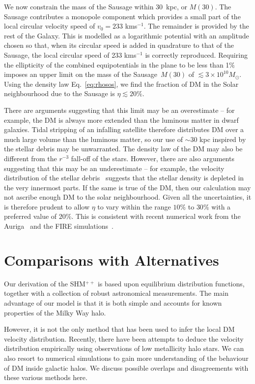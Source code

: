 \documentclass[prd,10pt,twocolumn,showpacs,nofootinbib, aps,superscriptaddress,preprintnumbers]{revtex4-1}
\begin{document}
We now constrain the mass of the Sausage within 30~kpc, or
$M(30)$. The Sausage contributes a monopole component which provides a
small part of the local circular velocity speed of $v_0 = 233$
kms$^{-1}$.  The remainder is provided by the rest of the Galaxy. This
is modelled as a logarithmic potential with an amplitude chosen so
that, when its circular speed is added in quadrature to that of the
Sausage, the local circular speed of 233 kms$^{-1}$ is correctly
reproduced.  Requiring the ellipticity of the combined equipotentials
in the plane to be less than 1\% imposes an upper limit on the
mass of the Sausage~$M(30)$ of $\lesssim 3 \times 10^{10}
M_\odot$. Using the density law Eq.~\eqref{eq:rhosos}, we find the
fraction of DM in the Solar neighbourhood due to the Sausage is $\eta
\lesssim 20\%$.

There are arguments suggesting that this limit may be an overestimate
-- for example, the DM is always more extended than the luminous
matter in dwarf galaxies. Tidal stripping of an infalling satellite
therefore distributes DM over a much large volume than the luminous
matter, so our use of $\sim 30$ kpc inspired by the stellar debris may
be unwarranted. The density law of the DM may also be different from
the $r^{-3}$ fall-off of the stars.  However, there are also arguments
suggesting that this may be an underestimate -- for example, the
velocity distribution of the stellar debris~\cite{La18} suggests that
the stellar density is depleted in the very innermost parts. If the
same is true of the DM, then our calculation may not ascribe enough DM
to the solar neighbourhood. Given all the uncertainties, it is
therefore prudent to allow $\eta$ to vary within the range $10\%$ to
$30\%$ with a preferred value of $20\%$. This is consistent with
recent numerical work from the Auriga~\citep{Fa18} and the FIRE
simulations~\citep{Fire18}.


\section{Comparisons with Alternatives}\label{sec:alternatives}

Our derivation of the SHM$^{++}$ is based upon equilibrium
distribution functions, together with a collection of robust
astronomical measurements. The main advantage of our model is that it
is both simple and accounts for known properties of the Milky Way halo. 

However, it is not the only method that has been used to infer the
local DM velocity distribution.  Recently, there have been attempts to
deduce the velocity distribution empirically using observations of
low metallicity halo stars. We can also resort to numerical simulations to gain
more understanding of the behaviour of DM inside galactic halos.  We
discuss possible overlaps and disagreements with these various methods
here.
\end{document}
